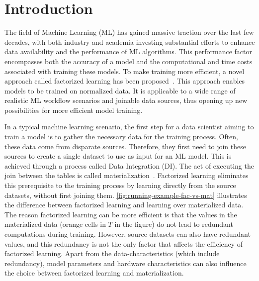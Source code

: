 
\chapter{Introduction}
\label{chapter:introduction}

The field of Machine Learning (ML) has gained massive traction over the last few decades, with both industry and academia investing substantial efforts to enhance data availability and the performance of ML algorithms. This performance factor encompasses both the accuracy of a model and the computational and time costs associated with training these models.  To make training more efficient, a novel approach called factorized learning has been proposed~\cite{orion_learning_gen_lin_models}. This approach enables models to be trained on normalized data. It is applicable to a wide range of realistic ML workflow scenarios and joinable data sources, thus opening up new possibilities for more efficient model training.

In a typical machine learning scenario, the first step for a data scientist aiming to train a model is to gather the necessary data for the training process. Often, these data come from disparate sources. Therefore, they first need to join these sources to create a single dataset to use as input for an ML model. This is achieved through a process called Data Integration (DI). The act of executing the join between the tables is called materialization~\cite{rel_db_glossary}. Factorized learning eliminates this prerequisite to the training process by learning directly from the source datasets, without first joining them. \autoref{fig:running-example-fac-vs-mat} illustrates the difference between factorized learning and learning over materialized data. The reason factorized learning can be more efficient is that the values in the materialized data (orange cells in $T$ in the figure) do not lead to redundant computations during training. However, source datasets can also have redundant values, and this redundancy is not the only factor that affects the efficiency of factorized learning. Apart from the data-characteristics (which include redundancy), model parameters and hardware characteristics can also influence the choice between factorized learning and materialization.


